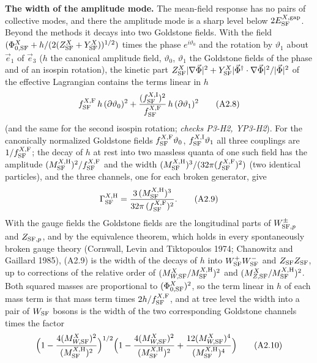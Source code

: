 \documentclass[
  10pt,
]{article}
\begin{document}
\textbf{The width of the amplitude mode.} The mean-field response has no
pairs of collective modes, and there the amplitude mode is a sharp level
below \(2E^{X,{\rm gap}}_{\rm SF}\). Beyond the methods it decays into
two Goldstone fields. With the field
\((\Phi^X_{0,{\rm SF}}+h/(2(Z^X_{\rm SF}+Y^X_{\rm SF}))^{1/2})\) times
the phase \(e^{i\vartheta_0}\) and the rotation by \(\vartheta_1\) about
\(\vec e_1\) of \(\vec e_3\) (\(h\) the canonical amplitude field,
\(\vartheta_0\), \(\vartheta_1\) the Goldstone fields of the phase and
of an isospin rotation), the kinetic part
\(Z^X_{\rm SF}\lvert\nabla\vec\Phi\rvert^2+Y^X_{\rm SF}\lvert\vec\Phi^\dagger\cdot\nabla\vec\Phi\rvert^2/\lvert\vec\Phi\rvert^2\)
of the effective Lagrangian contains the terms linear in \(h\)
\[f^{X,{\rm F}}_{\rm SF}\,h\,(\partial\vartheta_0)^2+\frac{(f^{X,{\rm I}}_{\rm SF})^2}{f^{X,{\rm F}}_{\rm SF}}\,h\,(\partial\vartheta_1)^2\tag{A2.8}\]
(and the same for the second isospin rotation; \emph{checks P3-H2,
YP3-H2}). For the canonically normalized Goldstone fields
\(f^{X,{\rm F}}_{\rm SF}\vartheta_0\),
\(f^{X,{\rm I}}_{\rm SF}\vartheta_1\) all three couplings are
\(1/f^{X,{\rm F}}_{\rm SF}\); the decay of \(h\) at rest into two
massless quanta of one such field has the amplitude
\((M^{X,{\rm H}}_{\rm SF})^2/f^{X,{\rm F}}_{\rm SF}\) and the width
\((M^{X,{\rm H}}_{\rm SF})^3/(32\pi(f^{X,{\rm F}}_{\rm SF})^2)\) (two
identical particles), and the three channels, one for each broken
generator, give
\[\Gamma^{X,{\rm H}}_{\rm SF}=\frac{3\,(M^{X,{\rm H}}_{\rm SF})^3}{32\pi\,(f^{X,{\rm F}}_{\rm SF})^2}.\tag{A2.9}\]
With the gauge fields the Goldstone fields are the longitudinal parts of
\(W^\pm_{{\rm SF},p}\) and \(Z_{{\rm SF},p}\), and by the equivalence
theorem, which holds in every spontaneously broken gauge theory
(Cornwall, Levin and Tiktopoulos 1974; Chanowitz and Gaillard 1985),
(A2.9) is the width of the decays of \(h\) into
\(W^+_{\rm SF}W^-_{\rm SF}\) and \(Z_{\rm SF}Z_{\rm SF}\), up to
corrections of the relative order of
\((M^X_{W,{\rm SF}}/M^{X,{\rm H}}_{\rm SF})^2\) and
\((M^X_{Z,{\rm SF}}/M^{X,{\rm H}}_{\rm SF})^2\). Both squared masses are
proportional to \((\Phi^X_{0,{\rm SF}})^2\), so the term linear in \(h\)
of each mass term is that mass term times \(2h/f^{X,{\rm F}}_{\rm SF}\),
and at tree level the width into a pair of \(W_{\rm SF}\) bosons is the
width of the two corresponding Goldstone channels times the factor
\[\Big(1-\frac{4(M^X_{W,{\rm SF}})^2}{(M^{X,{\rm H}}_{\rm SF})^2}\Big)^{1/2}\Big(1-\frac{4(M^X_{W,{\rm SF}})^2}{(M^{X,{\rm H}}_{\rm SF})^2}+\frac{12(M^X_{W,{\rm SF}})^4}{(M^{X,{\rm H}}_{\rm SF})^4}\Big)\tag{A2.10}\]
\end{document}
